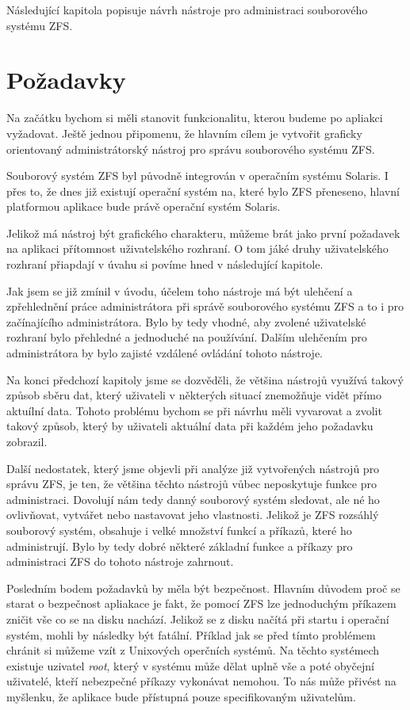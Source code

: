 Následující kapitola popisuje návrh nástroje pro administraci souborového systému ZFS.
\section{Požadavky}
Na začátku bychom si měli stanovit funkcionalitu, kterou budeme po apliakci vyžadovat. Ještě jednou připomenu, že hlavním cílem je vytvořit graficky orientovaný administrátorský nástroj pro správu souborového systému ZFS. 

Souborový systém ZFS byl původně integrován v operačním systému Solaris. I přes to, že dnes již existují operační systém na, které bylo ZFS přeneseno, hlavní platformou aplikace bude právě operační systém Solaris.

Jelikož má nástroj být grafického charakteru, můžeme brát jako první požadavek na aplikaci přítomnost uživatelského rozhraní. O tom jáké druhy uživatelského rozhraní přiapdají v úvahu si povíme hned v následující kapitole.

Jak jsem se již zmínil v úvodu, účelem toho nástroje má být ulehčení a zpřehlednění práce administrátora při správě souborového systému ZFS a to i pro začínajícího administrátora.  Bylo by tedy vhodné, aby zvolené uživatelské rozhraní bylo přehledné a jednoduché na používání. Dalším ulehčením pro administrátora by bylo zajisté vzdálené ovládání tohoto nástroje.

Na konci předchozí kapitoly jsme se dozvěděli, že většina nástrojů využívá takový způsob sběru dat, který uživateli v některých situací znemožňuje vidět přímo aktuílní data. Tohoto problému bychom se při návrhu měli vyvarovat a zvolit takový způsob, který by uživateli aktuální data při každém jeho požadavku zobrazil.

Další nedostatek, který jsme objevli při analýze již vytvořených nástrojů pro správu ZFS, je ten, že většina těchto nástrojů vůbec neposkytuje funkce pro administraci. Dovolují nám tedy danný souborový systém sledovat, ale né ho ovlivňovat, vytvářet nebo nastavovat jeho vlastnosti. Jelikož je ZFS rozsáhlý souborový systém, obsahuje i velké množství funkcí a příkazů, které ho administrují. Bylo by tedy dobré některé základní funkce a příkazy pro administraci ZFS do tohoto nástroje zahrnout. 

Posledním bodem požadavků by měla být bezpečnost. Hlavním důvodem proč se starat o bezpečnost apliakace je fakt, že pomocí ZFS lze jednoduchým příkazem zničit vše co se na disku nachází. Jelikož se z disku načítá při startu i operační systém, mohli by následky být fatální. Příklad jak se před tímto problémem chránit si můžeme vzít z Unixových operčních systémů. Na těchto systémech existuje uzivatel \emph{root}, který v systému může dělat uplně vše a poté obyčejní uživatelé, kteří nebezpečné příkazy vykonávat nemohou. To nás může přivést na myšlenku, že aplikace bude přístupná pouze specifikovaným uživatelům.

